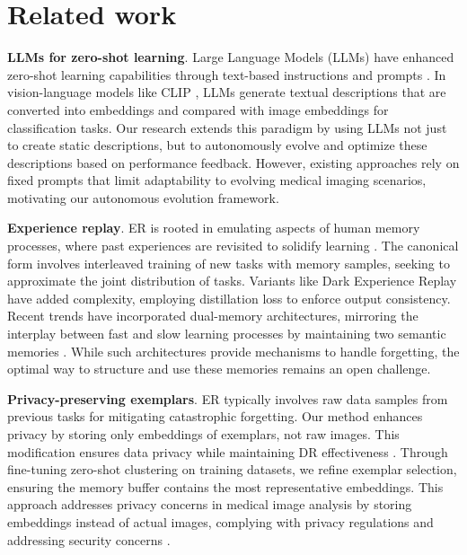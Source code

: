 \documentclass[pdflatex,sn-mathphys-num]{sn-jnl}%
\theoremstyle{thmstyleone}%
\theoremstyle{thmstyletwo}%
\theoremstyle{thmstylethree}%
\begin{document}






\section{Related work}
\label{sec:related}

\noindent\textbf{LLMs for zero-shot learning}. Large Language Models (LLMs) have enhanced zero-shot learning capabilities through text-based instructions and prompts \cite{Brown2020}. In vision-language models like CLIP \cite{Radford2021}, LLMs generate textual descriptions that are converted into embeddings and compared with image embeddings for classification tasks. Our research extends this paradigm by using LLMs not just to create static descriptions, but to autonomously evolve and optimize these descriptions based on performance feedback. However, existing approaches rely on fixed prompts that limit adaptability to evolving medical imaging scenarios, motivating our autonomous evolution framework.

\noindent\textbf{Experience replay}. ER is rooted in emulating aspects of human memory processes, where past experiences are revisited to solidify learning \cite{Riemer18}. The canonical form involves interleaved training of new tasks with memory samples, seeking to approximate the joint distribution of tasks. Variants like Dark Experience Replay \cite{Buzzega20} have added complexity, employing distillation loss to enforce output consistency. Recent trends have incorporated dual-memory architectures, mirroring the interplay between fast and slow learning processes by maintaining two semantic memories \cite{Arani21}. While such architectures provide mechanisms to handle forgetting, the optimal way to structure and use these memories remains an open challenge.

\noindent\textbf{Privacy-preserving exemplars}. ER typically involves raw data samples from previous tasks for mitigating catastrophic forgetting. Our method enhances privacy by storing only embeddings of exemplars, not raw images. This modification ensures data privacy while maintaining DR effectiveness \cite{ICARL,DGR}. Through fine-tuning zero-shot clustering on training datasets, we refine exemplar selection, ensuring the memory buffer contains the most representative embeddings. This approach addresses privacy concerns in medical image analysis by storing embeddings instead of actual images, complying with privacy regulations and addressing security concerns \cite{ShokriShmatikov2015}.
\end{document}
